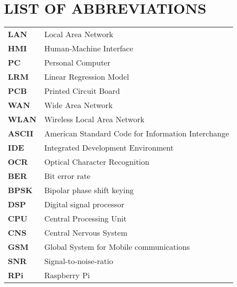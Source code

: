 
\section*{LIST OF ABBREVIATIONS}

\begin{tabular}{p{3cm}l}
\textbf{LAN}		& Local Area Network \\
\textbf{HMI}		& Human-Machine Interface\\
\textbf{PC}			& Personal Computer\\
\textbf{LRM}		& Linear Regression Model\\
\textbf{PCB}		& Printed Circuit Board \\
\textbf{WAN}		& Wide Area Network\\
\textbf{WLAN}		& Wireless Local Area Network\\
\textbf{ASCII}		& American Standard Code for Information Interchange\\
\textbf{IDE}		& Integrated Development Environment\\
\textbf{OCR}		& Optical Character Recognition\\
\textbf{BER}		& Bit error rate\\
\textbf{BPSK}		& Bipolar phase shift keying\\
\textbf{DSP}		& Digital signal processor\\
\textbf{CPU}		& Central Processing Unit\\
\textbf{CNS}		& Central Nervous System\\
\textbf{GSM}		& Global System for Mobile communications\\
\textbf{SNR}		& Signal-to-noise-ratio\\ 
\textbf{RPi}		& Raspberry Pi\\

\end{tabular}
